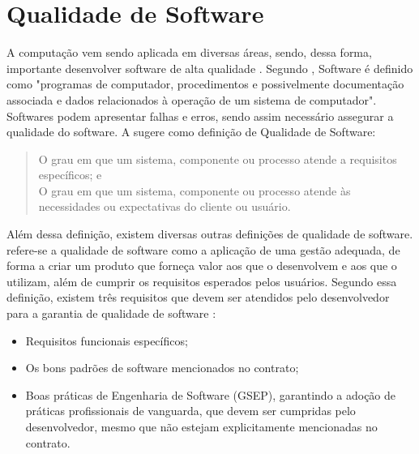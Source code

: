 \section{Qualidade de Software}

A computação vem sendo aplicada em diversas áreas, sendo, dessa forma, importante desenvolver software de alta qualidade . Segundo , Software é definido como "programas de computador, procedimentos e possivelmente documentação associada e dados relacionados à operação de um sistema de computador". Softwares podem apresentar falhas e erros, sendo assim necessário assegurar a qualidade do software. A  sugere como definição de Qualidade de Software:
\begin{quote}
O grau em que um sistema, componente ou processo atende a requisitos específicos; e \\
O grau em que um sistema, componente ou processo atende às necessidades ou expectativas do cliente ou usuário.
\end{quote}

Além dessa definição, existem diversas outras definições de qualidade de software.  refere-se a qualidade de software como a aplicação de uma gestão adequada, de forma a criar um produto que forneça valor aos que o desenvolvem e aos que o utilizam, além de cumprir os requisitos esperados pelos usuários. Segundo essa definição, existem três requisitos que devem ser atendidos pelo desenvolvedor para a garantia de qualidade de software :

\begin{itemize}
    \item Requisitos funcionais específicos;
    \item Os bons padrões de software mencionados no contrato;
    \item Boas práticas de Engenharia de Software (GSEP), garantindo a adoção de práticas profissionais de vanguarda, que devem ser cumpridas pelo desenvolvedor, mesmo que não estejam explicitamente mencionadas no contrato.
\end{itemize}

